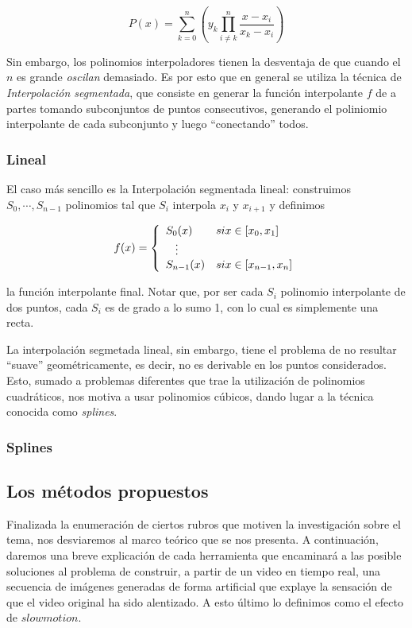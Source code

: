 \[P(x) = \sum_{k = 0}^n \left(y_k \prod_{i \neq k}^n \frac{x - x_i}{x_k - x_i}\right)\]

Sin embargo, los polinomios interpoladores tienen la desventaja de que cuando el $n$ es grande \emph{oscilan} demasiado. Es por esto que en general se utiliza la técnica de \emph{Interpolación segmentada}, que consiste en generar la función interpolante $f$ de a partes tomando subconjuntos de puntos consecutivos, generando el poliniomio interpolante de cada subconjunto y luego ``conectando'' todos.

\subsubsection{Lineal}

El caso más sencillo es la Interpolación segmentada lineal: construimos $S_0, \cdots, S_{n - 1}$ polinomios tal que $S_i$ interpola $x_i$ y $x_{i + 1}$ y definimos

\[
f(x) = 
\left\{
    \begin{array}{ll}
        S_0(x)  & \mbox{si } x \in [x_{0}, x_1] \\
        \hspace{0.3cm}\vdots \\     
        S_{n - 1}(x) & \mbox{si } x \in [x_{n - 1}, x_n]
    \end{array}
\right.
\]

la función interpolante final. Notar que, por ser cada $S_i$ polinomio interpolante de dos puntos, cada $S_i$ es de grado a lo sumo 1, con lo cual es simplemente una recta.

La interpolación segmetada lineal, sin embargo, tiene el problema de no resultar ``suave'' geométricamente, es decir, no es derivable en los puntos considerados. Esto, sumado a problemas diferentes que trae la utilización de polinomios cuadráticos, nos motiva a usar polinomios cúbicos, dando lugar a la técnica conocida como \emph{splines}.

\subsubsection{Splines}

\subsection{Los m\'etodos propuestos}

Finalizada la enumeraci\'on de ciertos rubros que motiven la investigaci\'on sobre el tema, nos desviaremos al marco te\'orico que se nos presenta. A continuaci\'on, daremos una breve explicaci\'on de cada herramienta que encaminar\'a a las posible soluciones al problema de construir, a partir de un video en tiempo real, una secuencia de im\'agenes generadas de forma artificial que explaye la sensaci\'on de que el video original ha sido alentizado. A esto \'ultimo lo definimos como el efecto de $slowmotion$.

